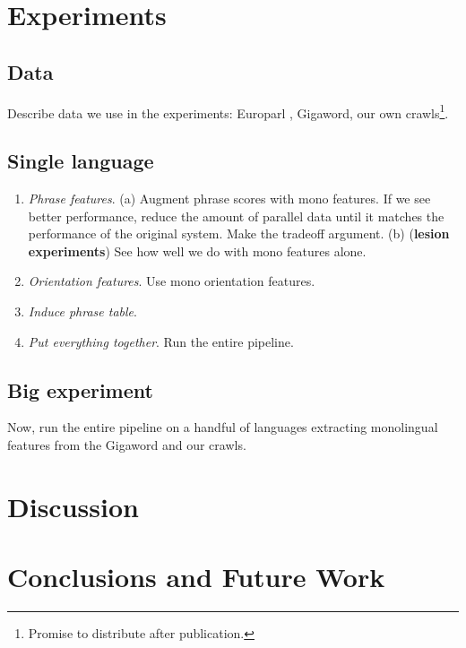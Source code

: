 \documentclass[11pt]{article}
\begin{document}

\section{Experiments} \label{sect:exp}

\subsection{Data}
Describe data we use in the experiments:  Europarl \cite{Koehn:2005}, Gigaword, our own crawls\footnote{Promise to distribute after publication.}.

\subsection{Single language}

\begin{enumerate}
\item {\em Phrase features}.  (a) Augment phrase scores with mono features.  If we see better performance, reduce the amount of parallel data until it matches the performance of the original system.  Make the tradeoff argument.  (b) ({\bf lesion experiments}) See how well we do with mono features alone.
\item {\em Orientation features}. Use mono orientation features.
\item {\em Induce phrase table}.
\item {\em Put everything together}.  Run the entire pipeline.
\end{enumerate}

\subsection{Big experiment}

Now, run the entire pipeline on a handful of languages extracting monolingual features from the Gigaword and our crawls.


\section{Discussion} \label{sect:disc}


\section{Conclusions and Future Work} \label{sect:conc}
\end{document}

